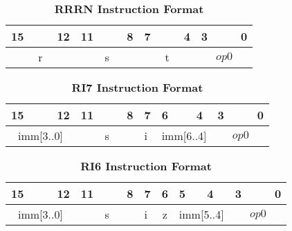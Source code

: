 \begin{table}[H]
	\caption{\textbf{RRRN Instruction Format}}
	\begin{tabular}{llllllllllllllll}
        15 & & & 12 & 11 & & & 8 & 7 &  & & 4 & 3 & & & 0 \\
		\hline
		\multicolumn{4}{|c|}{r} & \multicolumn{4}{c|}{s} & \multicolumn{4}{c|}{t} & \multicolumn{4}{c|}{$op0$}\\
		\hline
	\end{tabular}
\end{table}

\begin{table}[H]
	\caption{\textbf{RI7 Instruction Format}}
	\begin{tabular}{llllllllllllllll}
		15 & & & 12 & 11 & & & 8 & 7 & 6  & & 4 & 3 & & & 0 \\
		\hline
		\multicolumn{4}{|c|}{imm[3..0]} & \multicolumn{4}{c|}{s} & i & \multicolumn{3}{|c|}{imm[6..4]} & \multicolumn{4}{c|}{$op0$}\\
		\hline
	\end{tabular}
\end{table}

\begin{table}[H]
	\caption{\textbf{RI6 Instruction Format}}
	\begin{tabular}{llllllllllllllll}
		15 & & & 12 & 11 & & & 8 & 7 & 6  & 5 & 4 & 3 & & & 0 \\
		\hline
		\multicolumn{4}{|c|}{imm[3..0]} & \multicolumn{4}{c|}{s} & i & \multicolumn{1}{c|}{z} & \multicolumn{2}{c|}{imm[5..4]} & \multicolumn{4}{c|}{$op0$}\\
		\hline
	\end{tabular}
\end{table}